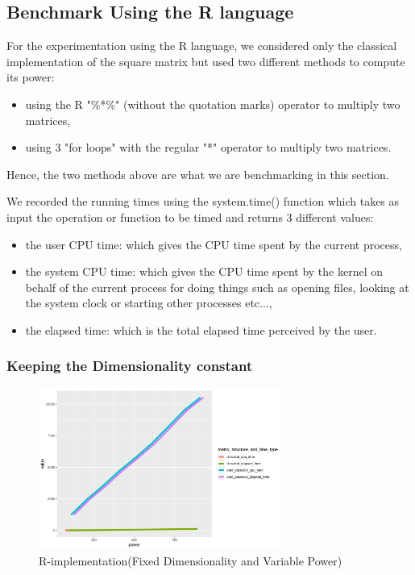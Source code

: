 \documentclass[12pt]{article}
\begin{document}
		\subsection{Benchmark Using the R language}
			For the experimentation using the R language, we considered only the classical implementation of the square matrix but used two different methods to compute its power:
			\begin{itemize}
				\item using the R "\%*\%" (without the quotation marks) operator to multiply two matrices,
				\item using 3 "for loops" with the regular "*" operator to multiply two matrices.
			\end{itemize}
			Hence, the two methods above are what we are benchmarking in this section.
			
			We recorded the running times using the system.time() function which takes as input the operation or function to be timed and returns 3 different values: 
			\begin{itemize}
				\item the user CPU time: which gives the CPU time spent by the current process,
				\item the system CPU time: which gives the CPU time spent by the kernel on behalf of the current process for doing things such as opening files, looking at the system clock or starting other processes etc...,
				\item the elapsed time: which is the total elapsed time perceived by the user.
			
			\end{itemize} 
			\subsubsection{Keeping the Dimensionality constant}
				\begin{figure}[h]
					\includegraphics[width= 8cm]{../images/R_fixed_dim.png}
					\caption{R-implementation(Fixed Dimensionality and Variable Power)}
				\end{figure}
			
\end{document}
